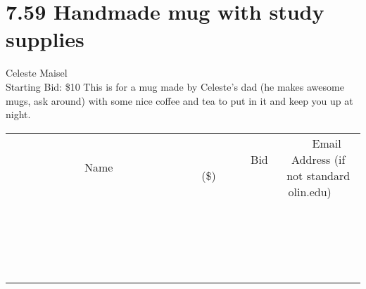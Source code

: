 \documentclass[11pt]{article}
\begin{document}
\section*{7.59 Handmade mug with study supplies}
Celeste Maisel
\\
Starting Bid: \$10
\newline
This is for a mug made by Celeste's dad (he makes awesome mugs, ask around) with some nice coffee and tea to put in it and keep you up at night.
\\[3ex]
\begin{tabular}{c c c}
~~~~~~~~~~~~~Name~~~~~~~~~~~~~ & ~~~~~~~~~Bid (\$)~~~~~~~~~  & ~~~Email Address (if not standard olin.edu)~~~\\
 & & \\
\hline
 & & \\
\hline
 & & \\
\hline
 & & \\
\hline
 & & \\
\hline
 & & \\
\hline
 & & \\
\hline
 & & \\
\hline
 & & \\
\hline
 & & \\
\hline
 & & \\
\hline
 & & \\
\hline
 & & \\
\hline
 & & \\
\hline
 & & \\
\hline
 & & \\
\hline
 & & \\
\hline
 & & \\
\hline
 & & \\
\hline
\end{tabular}
\newpage
\end{document}
